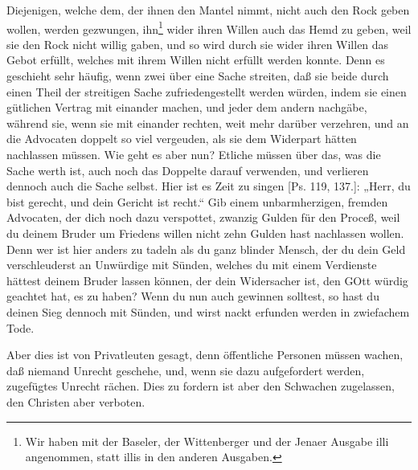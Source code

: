 Diejenigen, welche dem, der ihnen den Mantel nimmt, nicht auch den Rock geben wollen, werden gezwungen, ihn\footnote{Wir haben mit der Baseler, der Wittenberger und der Jenaer Ausgabe illi angenommen, statt illis in den anderen Ausgaben.} wider ihren Willen auch das Hemd zu geben, weil sie den Rock nicht willig gaben, und so wird durch sie wider ihren Willen das Gebot erfüllt, welches mit ihrem Willen nicht erfüllt werden konnte. Denn es geschieht sehr häufig, wenn zwei über eine Sache streiten, daß sie beide durch einen Theil der streitigen Sache zufriedengestellt werden würden, indem sie einen gütlichen Vertrag mit einander machen, und jeder dem andern nachgäbe, während sie, wenn sie mit einander rechten, weit mehr darüber verzehren, und an die Advocaten doppelt so viel vergeuden, als sie dem Widerpart hätten nachlassen müssen. Wie geht es aber nun? Etliche müssen über das, was die Sache werth ist, auch noch das Doppelte darauf verwenden, und verlieren dennoch auch die Sache selbst. Hier ist es Zeit zu singen [Ps. 119, 137.]: „Herr, du bist gerecht, und dein Gericht ist recht.“ Gib einem unbarmherzigen, fremden Advocaten, der dich noch dazu verspottet, zwanzig Gulden für den Proceß, weil du deinem Bruder um Friedens willen nicht zehn Gulden hast nachlassen wollen. Denn wer ist hier anders zu tadeln als du ganz blinder Mensch, der du dein Geld verschleuderst an Unwürdige mit Sünden, welches du mit einem Verdienste hättest deinem Bruder lassen können, der dein Widersacher ist, den GOtt würdig geachtet hat, es zu haben? Wenn du nun auch gewinnen solltest, so hast du deinen Sieg dennoch mit Sünden, und wirst nackt erfunden werden in zwiefachem Tode.

Aber dies ist von Privatleuten gesagt, denn öffentliche Personen müssen wachen, daß niemand Unrecht geschehe, und, wenn sie dazu aufgefordert werden, zugefügtes Unrecht rächen. Dies zu fordern ist aber den Schwachen zugelassen, den Christen aber verboten.

